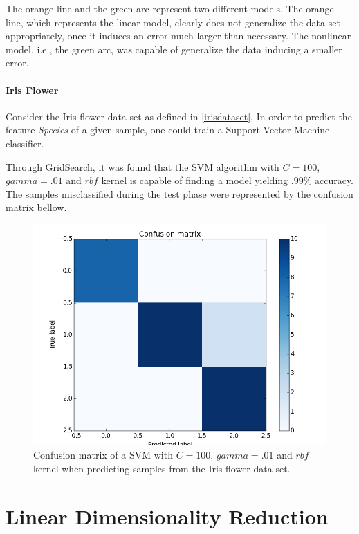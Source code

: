 \documentclass[12pt]{report}
\begin{document}
The orange line and the green arc represent two different models. The orange line, which represents the linear model, clearly does not generalize the data set appropriately, once it induces an error much larger than necessary. \cite{roh2015} The nonlinear model, i.e., the green arc, was capable of generalize the data inducing a smaller error.

\subsubsection{Iris Flower}

Consider the Iris flower data set as defined in \ref{irisdataset}. In order to predict the feature {\em Species} of a given sample, one could train a Support Vector Machine classifier.

Through GridSearch, it was found that the SVM algorithm with $C=100$, $gamma=.01$ and $rbf$ kernel is capable of finding a model yielding .99\% accuracy. The samples misclassified during the test phase were represented by the confusion matrix bellow.

\begin{figure}[H]
	\centering
	\captionsetup{justification=centering}

	\includegraphics[scale=.5]{svm_cm_iris}
	\caption{Confusion matrix of a SVM with $C=100$, $gamma=.01$ and $rbf$ kernel when predicting samples from the Iris flower data set.}
	\label{fig:cmsvmiris}
\end{figure}

\chapter{Linear Dimensionality Reduction}
\end{document}
